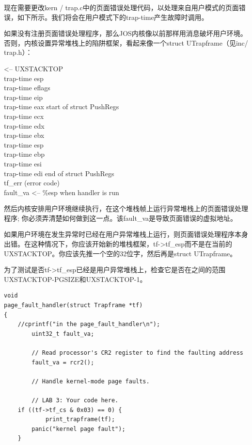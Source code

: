 \begin{ExerciseList}
现在需要更改kern / trap.c中的页面错误处理代码，以处理来自用户模式的页面错误，如下所示。我们将会在用户模式下的trap-time产生故障时调用。

如果没有注册页面错误处理程序，那么JOS内核像以前那样用消息破坏用户环境。否则，内核设置异常堆栈上的陷阱框架，看起来像一个struct UTrapframe（见inc/ trap.h）：

{\noindent\small                     <-- UXSTACKTOP\\
trap-time esp\\
trap-time eflags\\
trap-time eip\\
trap-time eax       start of struct PushRegs\\
trap-time ecx\\
trap-time edx\\
trap-time ebx\\
trap-time esp\\
trap-time ebp\\
trap-time esi\\
trap-time edi       end of struct PushRegs\\
tf\_err (error code)\\
fault\_va            <-- \%esp when handler is run\\
}

然后内核安排用户环境继续执行，在这个堆栈帧上运行异常堆栈上的页面错误处理程序; 你必须弄清楚如何做到这一点。该fault\_va是导致页面错误的虚拟地址。

如果用户环境在发生异常时已经在用户异常堆栈上运行，则页面错误处理程序本身出错。在这种情况下，你应该开始新的堆栈框架，tf->tf\_esp而不是在当前的 UXSTACKTOP。你应该先推一个空的32位字，然后再是struct UTrapframe。

为了测试是否tf->tf\_esp已经是用户异常堆栈上，检查它是否在之间的范围UXSTACKTOP-PGSIZE和UXSTACKTOP-1。


\begin{verbatim}
void
page_fault_handler(struct Trapframe *tf)
{
    //cprintf("in the page_fault_handler\n");
        uint32_t fault_va;

        // Read processor's CR2 register to find the faulting address
        fault_va = rcr2();

        // Handle kernel-mode page faults.

        // LAB 3: Your code here.
    if ((tf->tf_cs & 0x03) == 0) {
            print_trapframe(tf);
        panic("kernel page fault");
    }


\end{verbatim}
\end{ExerciseList}
